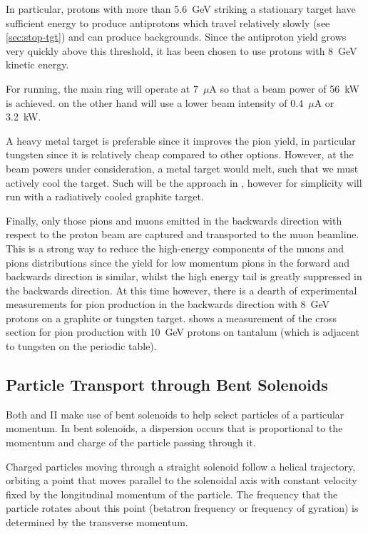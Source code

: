 In particular, protons with more than 5.6~GeV  striking a stationary target have sufficient energy to produce antiprotons which travel relatively slowly (see \ref{sec:stop-tgt}) and can produce backgrounds.
Since the antiproton yield grows very quickly above this threshold, it has been chosen to use protons with 8~GeV kinetic energy.

For \phaseII running, the main ring will operate at 7~$\mu$A so that a beam power of 56~kW is achieved.  
\phaseI on the other hand will use a lower beam intensity of 0.4~$\mu$A or 3.2~kW.

A heavy metal target is preferable since it improves the pion yield, in particular tungsten since it is relatively cheap compared to other options.
However, at the beam powers under consideration, a metal target would melt, such that we must actively cool the target.
Such will be the approach in \phaseII, however for simplicity \phaseI will run with a radiatively cooled graphite target.

\FigPionSpectraVsAngle

Finally, only those pions and muons emitted in the backwards direction with respect to the proton beam are captured and transported to the muon beamline.
This is a strong way to reduce the high-energy components of the muons and pions distributions since the yield for low momentum pions in the forward and backwards direction is similar, whilst the high energy tail is greatly suppressed in the backwards direction.
At this time however, there is a dearth of experimental measurements for pion production in the backwards direction with 8~GeV protons on a graphite or tungsten target.
 shows a measurement of the cross section for pion production with 10~GeV protons on tantalum (which is adjacent to tungsten on the periodic table).

\subsection{Particle Transport through Bent Solenoids}
Both \phaseI and II make use of bent solenoids to help select particles of a particular momentum.
In bent solenoids, a dispersion occurs that is proportional to the momentum and charge of the particle passing through it.

Charged particles moving through a straight solenoid follow a helical
trajectory, orbiting a point that moves parallel to the solenoidal axis with constant velocity fixed by the longitudinal momentum of the particle.
The frequency that the particle rotates about this point (betatron frequency or frequency of gyration) is determined by the transverse momentum.
\FigBentSolenoidRelativeDrift

